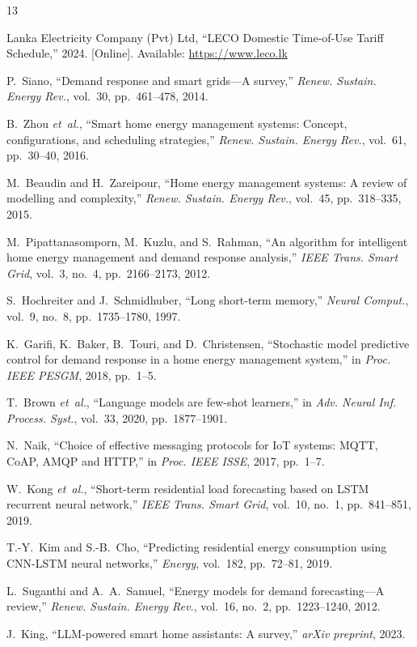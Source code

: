 \documentclass[10pt,a4paper,twocolumn]{article}
\begin{document}
\begin{thebibliography}{13}
\small

Lanka Electricity Company (Pvt) Ltd, ``LECO Domestic Time-of-Use Tariff Schedule,'' 2024. [Online]. Available: \url{https://www.leco.lk}

P.~Siano, ``Demand response and smart grids---A survey,'' \textit{Renew. Sustain. Energy Rev.}, vol.~30, pp.~461--478, 2014.

B.~Zhou \textit{et~al.}, ``Smart home energy management systems: Concept, configurations, and scheduling strategies,'' \textit{Renew. Sustain. Energy Rev.}, vol.~61, pp.~30--40, 2016.

M.~Beaudin and H.~Zareipour, ``Home energy management systems: A review of modelling and complexity,'' \textit{Renew. Sustain. Energy Rev.}, vol.~45, pp.~318--335, 2015.

M.~Pipattanasomporn, M.~Kuzlu, and S.~Rahman, ``An algorithm for intelligent home energy management and demand response analysis,'' \textit{IEEE Trans. Smart Grid}, vol.~3, no.~4, pp.~2166--2173, 2012.

S.~Hochreiter and J.~Schmidhuber, ``Long short-term memory,'' \textit{Neural Comput.}, vol.~9, no.~8, pp.~1735--1780, 1997.

K.~Garifi, K.~Baker, B.~Touri, and D.~Christensen, ``Stochastic model predictive control for demand response in a home energy management system,'' in \textit{Proc. IEEE PESGM}, 2018, pp.~1--5.

T.~Brown \textit{et~al.}, ``Language models are few-shot learners,'' in \textit{Adv. Neural Inf. Process. Syst.}, vol.~33, 2020, pp.~1877--1901.

N.~Naik, ``Choice of effective messaging protocols for IoT systems: MQTT, CoAP, AMQP and HTTP,'' in \textit{Proc. IEEE ISSE}, 2017, pp.~1--7.

W.~Kong \textit{et~al.}, ``Short-term residential load forecasting based on LSTM recurrent neural network,'' \textit{IEEE Trans. Smart Grid}, vol.~10, no.~1, pp.~841--851, 2019.

T.-Y.~Kim and S.-B.~Cho, ``Predicting residential energy consumption using CNN-LSTM neural networks,'' \textit{Energy}, vol.~182, pp.~72--81, 2019.

L.~Suganthi and A.~A.~Samuel, ``Energy models for demand forecasting---A review,'' \textit{Renew. Sustain. Energy Rev.}, vol.~16, no.~2, pp.~1223--1240, 2012.

J.~King, ``LLM-powered smart home assistants: A survey,'' \textit{arXiv preprint}, 2023.

\end{thebibliography}
\end{document}
